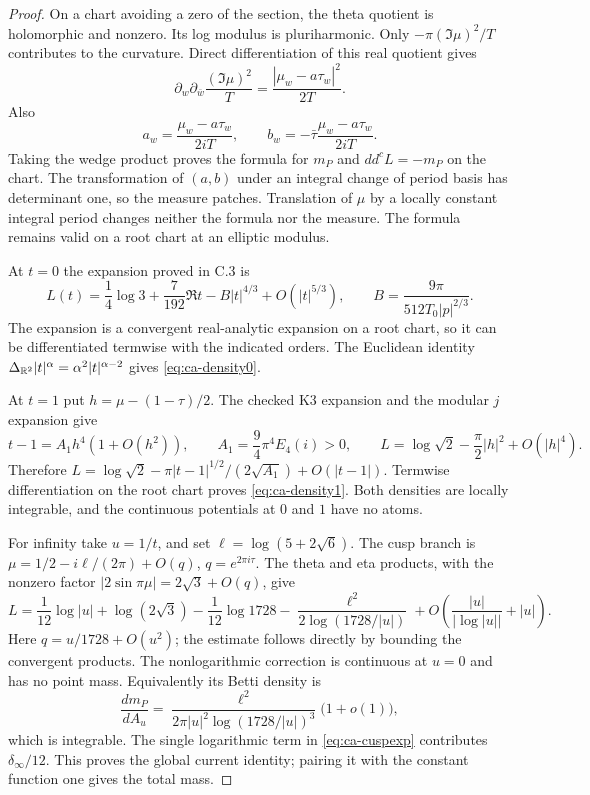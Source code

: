\begin{proof}
On a chart avoiding a zero of the section, the theta quotient
is holomorphic and nonzero. Its log modulus is pluriharmonic.
Only $-\pi(\Im\mu)^2/T$ contributes to the curvature.
Direct differentiation of this real quotient gives
\[
 \partial_w\partial_{\bar w}\frac{(\Im\mu)^2}{T}
       =\frac{|\mu_w-a\tau_w|^2}{2T}.
\]
Also
\[
 a_w=\frac{\mu_w-a\tau_w}{2iT},\qquad
 b_w=-\bar\tau\frac{\mu_w-a\tau_w}{2iT}.
\]
Taking the wedge product proves the formula for $m_P$ and
$dd^cL=-m_P$ on the chart. The transformation of $(a,b)$
under an integral change of period basis has determinant one,
so the measure patches. Translation of $\mu$ by a locally
constant integral period changes neither the formula nor
the measure. The formula remains valid on a root chart
at an elliptic modulus.

At $t=0$ the expansion proved in C.3 is
\[
 L(t)=\frac14\log3+\frac7{192}\Re t
       -B|t|^{4/3}+O(|t|^{5/3}),\qquad
 B=\frac{9\pi}{512T_0|p|^{2/3}}.
\]
The expansion is a convergent real-analytic expansion on a
root chart, so it can be differentiated termwise with the
indicated orders. The Euclidean identity
$\Delta_{\mathbb R^2}|t|^\alpha=\alpha^2|t|^{\alpha-2}$ gives
\eqref{eq:ca-density0}.

At $t=1$ put $h=\mu-(1-\tau)/2$. The checked K3 expansion
and the modular $j$ expansion give
\[
 t-1=A_1h^4(1+O(h^2)),\qquad
 A_1=\frac94\pi^4E_4(i)>0,\qquad
 L=\log\sqrt2-\frac\pi2|h|^2+O(|h|^4).
\]
Therefore
$L=\log\sqrt2-\pi|t-1|^{1/2}/(2\sqrt{A_1})+O(|t-1|)$.
Termwise differentiation on the root chart proves
\eqref{eq:ca-density1}. Both densities are locally integrable,
and the continuous potentials at $0$ and $1$ have no atoms.

For infinity take $u=1/t$, and set $\ell=\log(5+2\sqrt6)$.
The cusp branch is
$\mu=1/2-i\ell/(2\pi)+O(q)$, $q=e^{2\pi i\tau}$.
The theta and eta products, with the nonzero factor
$|2\sin\pi\mu|=2\sqrt3+O(q)$, give
\begin{equation}\label{eq:ca-cuspexp}
 L=\frac1{12}\log|u|+\log(2\sqrt3)-\frac1{12}\log1728
          -\frac{\ell^2}{2\log(1728/|u|)}
          +O\left(\frac{|u|}{|\log|u||}+|u|\right).
\end{equation}
Here $q=u/1728+O(u^2)$; the estimate follows directly by
bounding the convergent products. The nonlogarithmic
correction is continuous at $u=0$ and has no point mass.
Equivalently its Betti density is
\[
 \frac{dm_P}{dA_u}
  =\frac{\ell^2}{2\pi|u|^2\log(1728/|u|)^3}
       \bigl(1+o(1)\bigr),
\]
which is integrable. The single logarithmic term in
\eqref{eq:ca-cuspexp} contributes $\delta_\infty/12$.
This proves the global current identity; pairing it with
the constant function one gives the total mass.
\end{proof}

